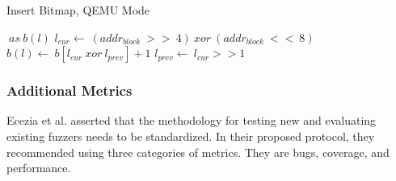 \begin{algorithm}
    \caption {Insert Bitmap, QEMU Mode}\label{qemu_bitmap}
    \begin{algorithmic}[1]
        $\ as\ b(l)$
                \State $l_{cur} \gets\ (addr_{block}\ >>\ 4)\ xor\ (addr_{block}\ <<\ 8)$
                \State $b(l) \gets\ b[l_{cur}\  xor\  l_{prev}] + 1$
                \State $l_{prev} \gets\ l_{cur} >> 1$
            \EndIf
        \EndProcedure
    \end{algorithmic}
\end{algorithm}

\subsubsection{Additional Metrics}
Ecezia et al. \cite{eceiza_improving_2023} asserted that the methodology for testing new and 
evaluating existing fuzzers needs to be standardized. In their proposed protocol, they 
recommended using three categories of metrics. They are bugs, coverage, and performance. 

